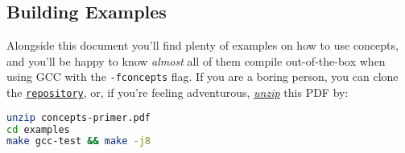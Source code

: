 \subsection*{Building Examples}

Alongside this document you'll find plenty of examples on how to use concepts, and you'll be happy to know \emph{almost} all of them compile out-of-the-box when using GCC with the \texttt{-fconcepts} flag. If you are a boring person, you can clone the \href{https://github.com/CaffeineViking/concepts-primer}{\texttt{repository}}, or, if you're feeling adventurous, \underline{\emph{unzip}} this PDF by:

\begin{lstlisting}[language=bash, morekeywords={unzip, make},
                                  deletekeywords={test}]
unzip concepts-primer.pdf
cd examples
make gcc-test && make -j8
\end{lstlisting}
